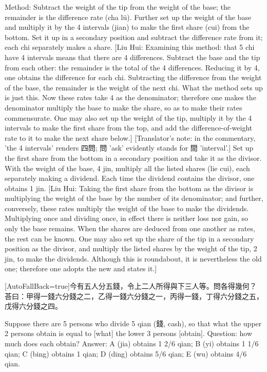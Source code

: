 \documentclass[11pt]{article}
\newcommand{\unitlabel}[1]{\marginpar{\raggedleft\tiny\color{gray}#1}}
\newenvironment{unitzh}{\par\CJKfontspec{Noto Serif CJK SC}[AutoFallBack=true]\large\linespread{1.25}\selectfont}{\par}
\newenvironment{uniten}{\par\small\color{black!85}}{\par\medskip}
\begin{document}
\begin{uniten}Method: Subtract the weight of the tip from the weight of the base; the remainder is the difference rate (cha lü). Further set up the weight of the base and multiply it by the 4 intervals (jian) to make the first share (cui) from the bottom. Set it up in a secondary position and subtract the difference rate from it; each chi separately makes a share. [Liu Hui: Examining this method: that 5 chi have 4 intervals means that there are 4 differences. Subtract the base and the tip from each other: the remainder is the total of the 4 differences. Reducing it by 4, one obtains the difference for each chi. Subtracting the difference from the weight of the base, the remainder is the weight of the next chi. What the method sets up is just this. Now these rates take 4 as the denominator; therefore one makes the denominator multiply the base to make the share, so as to make their rates commensurate. One may also set up the weight of the tip, multiply it by the 4 intervals to make the first share from the top, and add the difference-of-weight rate to it to make the next share below.] [Translator's note: in the commentary, 'the 4 intervals' renders 四問; 問 'ask' evidently stands for 間 'interval'.] Set up the first share from the bottom in a secondary position and take it as the divisor. With the weight of the base, 4 jin, multiply all the listed shares (lie cui), each separately making a dividend. Each time the dividend contains the divisor, one obtains 1 jin. [Liu Hui: Taking the first share from the bottom as the divisor is multiplying the weight of the base by the number of its denominator; and further, conversely, these rates multiply the weight of the base to make the dividends. Multiplying once and dividing once, in effect there is neither loss nor gain, so only the base remains. When the shares are deduced from one another as rates, the rest can be known. One may also set up the share of the tip in a secondary position as the divisor, and multiply the listed shares by the weight of the tip, 2 jin, to make the dividends. Although this is roundabout, it is nevertheless the old one; therefore one adopts the new and states it.]\end{uniten}

\begin{unitzh}\unitlabel{jiuzhang-027.1}今有五人分五錢，令上二人所得與下三人等。問各得幾何？荅曰：甲得一錢六分錢之二，乙得一錢六分錢之一，丙得一錢，丁得六分錢之五，戊得六分錢之四。\end{unitzh}
\begin{uniten}Suppose there are 5 persons who divide 5 qian (錢, cash), so that what the upper 2 persons obtain is equal to [what] the lower 3 persons [obtain]. Question: how much does each obtain? Answer: A (jia) obtains 1 2/6 qian; B (yi) obtains 1 1/6 qian; C (bing) obtains 1 qian; D (ding) obtains 5/6 qian; E (wu) obtains 4/6 qian.\end{uniten}
\end{document}
